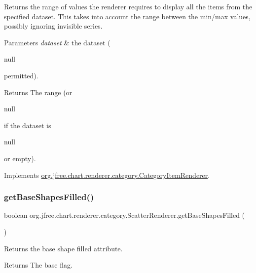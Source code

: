 Returns the range of values the renderer requires to display all the items from the specified dataset. This takes into account the range between the min/max values, possibly ignoring invisible series.


\begin{DoxyParams}{Parameters}
{\em dataset} & the dataset (
\begin{DoxyCode}
null 
\end{DoxyCode}
 permitted).\\
\hline
\end{DoxyParams}
\begin{DoxyReturn}{Returns}
The range (or
\begin{DoxyCode}
null 
\end{DoxyCode}
 if the dataset is 
\begin{DoxyCode}
null 
\end{DoxyCode}
 or empty). 
\end{DoxyReturn}


Implements \mbox{\hyperlink{interfaceorg_1_1jfree_1_1chart_1_1renderer_1_1category_1_1_category_item_renderer_aa7294c25a26ffd1725d7920a6041a785}{org.\+jfree.\+chart.\+renderer.\+category.\+Category\+Item\+Renderer}}.

\mbox{\label{classorg_1_1jfree_1_1chart_1_1renderer_1_1category_1_1_scatter_renderer_aeae2213e89a7da7ea1513117b5c1131f}} 
\subsubsection{\texorpdfstring{get\+Base\+Shapes\+Filled()}{getBaseShapesFilled()}}
{\footnotesize\ttfamily boolean org.\+jfree.\+chart.\+renderer.\+category.\+Scatter\+Renderer.\+get\+Base\+Shapes\+Filled (\begin{DoxyParamCaption}{ }\end{DoxyParamCaption})}

Returns the base \textquotesingle{}shape filled\textquotesingle{} attribute.

\begin{DoxyReturn}{Returns}
The base flag. 
\end{DoxyReturn}
\mbox{\label{classorg_1_1jfree_1_1chart_1_1renderer_1_1category_1_1_scatter_renderer_a0dac1c7119c34fe923357e583f3267c4}} 
